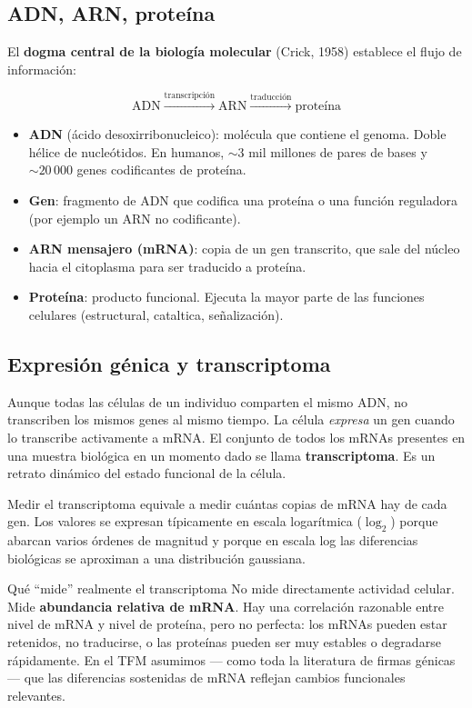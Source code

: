 \documentclass[11pt, a4paper]{article}
\begin{document}
\subsection{ADN, ARN, prote\'ina}

El \textbf{dogma central de la biolog\'ia molecular} (Crick, 1958)
establece el flujo de informaci\'on:

\[ \text{ADN} \xrightarrow{\text{transcripci\'on}} \text{ARN}
   \xrightarrow{\text{traducci\'on}} \text{prote\'ina} \]

\begin{itemize}[leftmargin=1.2em]
  \item \textbf{ADN} (\'acido desoxirribonucleico): mol\'ecula que
  contiene el genoma. Doble h\'elice de nucle\'otidos. En humanos, ${\sim}3$
  mil millones de pares de bases y ${\sim}20\,000$ genes codificantes de
  prote\'ina.
  \item \textbf{Gen}: fragmento de ADN que codifica una prote\'ina o una
  funci\'on reguladora (por ejemplo un ARN no codificante).
  \item \textbf{ARN mensajero (mRNA)}: copia de un gen transcrito, que
  sale del n\'ucleo hacia el citoplasma para ser traducido a prote\'ina.
  \item \textbf{Prote\'ina}: producto funcional. Ejecuta la mayor parte
  de las funciones celulares (estructural, cataltica, se\~nalizaci\'on).
\end{itemize}

\subsection{Expresi\'on g\'enica y transcriptoma}

Aunque todas las c\'elulas de un individuo comparten el mismo ADN, no
transcriben los mismos genes al mismo tiempo. La c\'elula \emph{expresa}
un gen cuando lo transcribe activamente a mRNA. El conjunto de todos los
mRNAs presentes en una muestra biol\'ogica en un momento dado se llama
\textbf{transcriptoma}. Es un retrato din\'amico del estado funcional de
la c\'elula.

Medir el transcriptoma equivale a medir cu\'antas copias de mRNA hay de
cada gen. Los valores se expresan t\'ipicamente en escala logar\'itmica
($\log_2$) porque abarcan varios \'ordenes de magnitud y porque en escala
log las diferencias biol\'ogicas se aproximan a una distribuci\'on
gaussiana.

\begin{concepto}{Qu\'e ``mide'' realmente el transcriptoma}
No mide directamente actividad celular. Mide \textbf{abundancia relativa
de mRNA}. Hay una correlaci\'on razonable entre nivel de mRNA y nivel de
prote\'ina, pero no perfecta: los mRNAs pueden estar retenidos, no
traducirse, o las prote\'inas pueden ser muy estables o degradarse
r\'apidamente. En el TFM asumimos --- como toda la literatura de firmas
g\'enicas --- que las diferencias sostenidas de mRNA reflejan cambios
funcionales relevantes.
\end{concepto}
\end{document}
